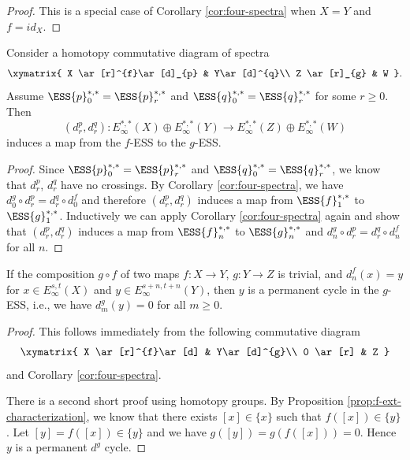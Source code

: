 \begin{proof}
This is a special case of Corollary \ref{cor:four-spectra} when $X=Y$ and $f=id_X$.
\end{proof}

\begin{corollary}\label{cor:ess-naturality}
    Consider a homotopy commutative diagram of spectra
    $$\xymatrix{
    X \ar[r]^{f}\ar[d]_{p} & Y\ar[d]^{q}\\
    Z \ar[r]_{g} & W
    }.$$
    Assume $\ESS{p}_0^{*,*}=\ESS{p}_r^{*,*}$ and $\ESS{q}_0^{*,*}=\ESS{q}_r^{*,*}$ for some $r\ge 0$. Then 
    $$(d^p_r, d^q_r): E_\infty^{*,*}(X)\oplus E_\infty^{*,*}(Y)\to E_\infty^{*,*}(Z)\oplus E_\infty^{*,*}(W)$$
    induces a map from the $f$-ESS to the $g$-ESS.
\end{corollary}

\begin{proof}
    Since $\ESS{p}_0^{*,*}=\ESS{p}_r^{*,*}$ and $\ESS{q}_0^{*,*}=\ESS{q}_r^{*,*}$, we know that $d^p_r$, $d^q_r$ have no crossings. By Corollary \ref{cor:four-spectra}, we have $d^g_0\circ d^p_r = d^q_r\circ d^f_0$ and therefore $(d^p_r, d^q_r)$ induces a map from $\ESS{f}_1^{*,*}$ to $\ESS{g}_1^{*,*}$. Inductively we can apply Corollary \ref{cor:four-spectra} again and show that $(d^p_r, d^q_r)$ induces a map from $\ESS{f}_n^{*,*}$ to $\ESS{g}_n^{*,*}$ and $d^g_n\circ d^p_r = d^q_r\circ d^f_n$ for all $n$.
\end{proof}

\begin{corollary}\label{cor:composition-zero}
    If the composition $g\circ f$ of two maps $f:X\to Y$, $g:Y\to Z$ is trivial, and $d_n^f(x)=y$ for $x\in E_\infty^{s,t}(X)$ and $y\in E_\infty^{s+n,t+n}(Y)$, then $y$ is a permanent cycle in the $g$-ESS, i.e., we have
    $d^g_m(y)=0$ for all $m\ge 0$.
\end{corollary}

\begin{proof}
    This follows immediately from the following commutative diagram
    $$\xymatrix{
    X \ar[r]^{f}\ar[d] & Y\ar[d]^{g}\\
    0 \ar[r] & Z
    }$$
    and Corollary \ref{cor:four-spectra}.

    There is a second short proof using homotopy groups. By Proposition \ref{prop:f-ext-characterization}, we know that there exists $[x]\in \{x\}$ such that $f([x])\in \{y\}$. Let $[y]=f([x])\in \{y\}$ and we have $g([y])=g(f([x]))=0$. Hence $y$ is a permanent $d^g$ cycle.
\end{proof}

